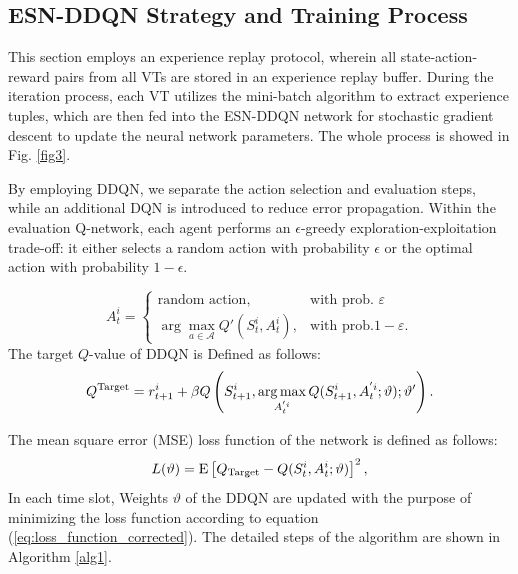 \documentclass[journal]{IEEEtran}
\begin{document}
\subsection{ESN-DDQN Strategy and Training Process}
This section employs an experience replay protocol, wherein all state-action-reward pairs from all VTs are stored in an experience replay buffer. During the iteration process, each VT utilizes the mini-batch algorithm to extract experience tuples, which are then fed into the ESN-DDQN network for stochastic gradient descent to update the neural network parameters. The whole process is showed in Fig. \ref{fig3}.\par
By employing DDQN, we separate the action selection and evaluation steps, while an additional DQN is introduced to reduce error propagation. Within the evaluation Q-network, each agent performs an $\epsilon$-greedy exploration-exploitation trade-off: it either selects a random action with probability $\epsilon$ or the optimal action with probability $1-\epsilon$.\par
\begin{equation}
\label{eq:action_selection_epsilon_greedy} 
A_t^i = \begin{cases}
    \text{random action}, & \text{with prob. } \varepsilon \\
    \arg\max_{a \in \mathcal{A}} Q'(S_t^i, A_t^i), & \text{with prob.} 1-\varepsilon.
\end{cases}
\end{equation}
The target $Q$-value of DDQN is Defined as follows:
\begin{equation}
\label{eq:q_target_exact} 
Q^{\rm{Target}} = r_{t + 1}^i + \beta Q\left(S_{t + 1}^{i}, \mathop {\arg \max }\limits_{A_t^{'i}} Q(S_{t + 1}^{i},A_t^{'i};\vartheta );\vartheta '\right).
\end{equation}
\par
The mean square error (MSE) loss function of the network is defined as follows:
\begin{equation}
\label{eq:loss_function_corrected} 
L(\vartheta ) = {\rm{E}}\left[ Q_{{\rm{Target}}} - Q(S_t^{i},A_t^{i};\vartheta ) \right]^2,
\end{equation}
In each time slot, Weights $\vartheta$ of the DDQN are updated with the 
purpose of minimizing the loss function according to equation (\ref{eq:loss_function_corrected}). The detailed steps of the algorithm are shown in Algorithm \ref{alg1}.
\end{document}
